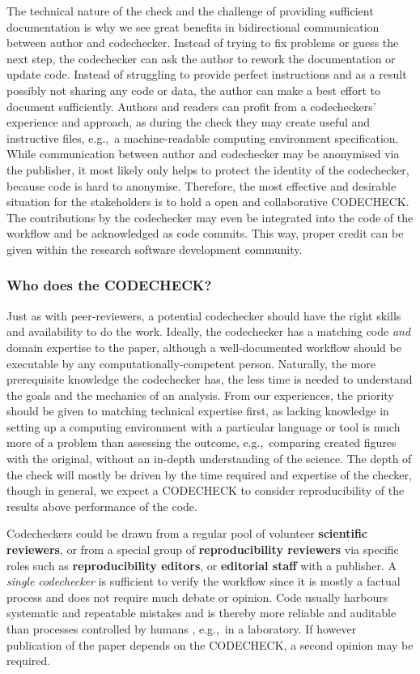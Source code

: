 \documentclass[12pt]{article}
\begin{document}
The technical nature of the check and the challenge of providing sufficient documentation is why we see great benefits in bidirectional communication between author and codechecker.
Instead of trying to
fix problems or guess the next step, the codechecker can ask the author to 
rework the documentation or update code.
Instead of struggling to provide perfect instructions and as a result possibly not sharing any code or data, the author can make a best effort to document sufficiently.
Authors and readers can profit from a codecheckers' experience and approach, as during the check they may create useful and instructive files, e.g.,~a machine-readable computing environment specification.
While communication between author and codechecker may be anonymised via
the publisher, it most likely only helps to protect the identity of
the codechecker, because code is hard to anonymise.
Therefore, the most effective and desirable situation for the
stakeholders is to hold a open and collaborative CODECHECK.
The contributions by the codechecker may even be integrated into
the code of the workflow and be acknowledged as code commits. This way, 
proper credit can be given within the research software development community.


\subsubsection*{Who does the CODECHECK?}\label{who-does-the-codecheck}

Just as with peer-reviewers, a potential codechecker should have the
right skills and availability to do the work.  Ideally, the
codechecker has a matching code \emph{and} domain expertise to the
paper, although a well-documented workflow should be executable by any
computationally-competent person. Naturally, the more
prerequisite knowledge the codechecker has, the less time is needed to
understand the goals and the mechanics of an analysis.  From our
experiences, the priority should be given to matching technical
expertise first, as lacking knowledge in setting up a computing
environment with a particular language or tool is much more of a
problem than assessing the outcome, e.g.,~comparing created figures
with the original, without an in-depth understanding of the science.
The depth of the check will mostly be driven by the time required and
expertise of the checker, though in general, we expect a CODECHECK 
to consider reproducibility of the results above performance of the code.


Codecheckers could be drawn from a regular pool of volunteer
\textbf{scientific reviewers}, or from a special group of
\textbf{reproducibility reviewers} via specific roles such as
\textbf{reproducibility editors}, or \textbf{editorial staff} with a
publisher.  A \emph{single codechecker} is sufficient to verify the
workflow since it is mostly a factual process and does not require much
debate or opinion.  Code usually harbours systematic and repeatable
mistakes and is thereby more reliable and auditable than processes
controlled by humans \cite{tibav:42484}, e.g.,~in a laboratory.  If
however publication of the paper depends on the CODECHECK, a second
opinion may be required.
\end{document}
